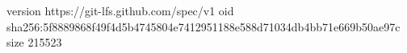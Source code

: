 version https://git-lfs.github.com/spec/v1
oid sha256:5f8889868f49f4d5b4745804e7412951188e588d71034db4bb71e669b50ae97c
size 215523
